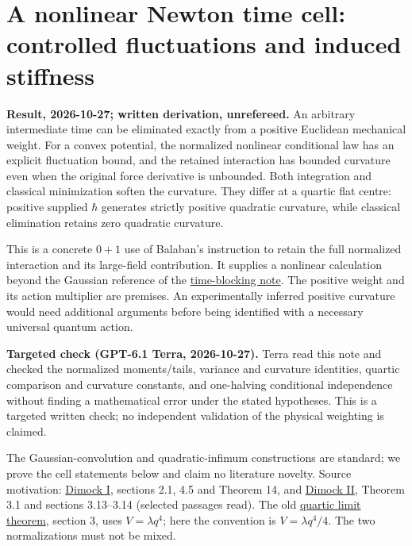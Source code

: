 \documentclass[11pt,a4paper]{article}
\begin{document}
\hypertarget{a-nonlinear-newton-time-cell-controlled-fluctuations-and-induced-stiffness}{%
\section{A nonlinear Newton time cell: controlled fluctuations and
induced
stiffness}\label{a-nonlinear-newton-time-cell-controlled-fluctuations-and-induced-stiffness}}

\textbf{Result, 2026-10-27; written derivation, unrefereed.} An
arbitrary intermediate time can be eliminated exactly from a positive
Euclidean mechanical weight. For a convex potential, the normalized
nonlinear conditional law has an explicit fluctuation bound, and the
retained interaction has bounded curvature even when the original force
derivative is unbounded. Both integration and classical minimization
soften the curvature. They differ at a quartic flat centre: positive
supplied \(\hbar\) generates strictly positive quadratic curvature,
while classical elimination retains zero quadratic curvature.

This is a concrete \(0+1\) use of Balaban's instruction to retain the
full normalized interaction and its large-field contribution. It
supplies a nonlinear calculation beyond the Gaussian reference of the
\href{balaban-newton-time-blocking.md}{time-blocking note}. The positive
weight and its action multiplier are premises. An experimentally
inferred positive curvature would need additional arguments before being
identified with a necessary universal quantum action.

\textbf{Targeted check (GPT-6.1 Terra, 2026-10-27).} Terra read this
note and checked the normalized moments/tails, variance and curvature
identities, quartic comparison and curvature constants, and one-halving
conditional independence without finding a mathematical error under the
stated hypotheses. This is a targeted written check; no independent
validation of the physical weighting is claimed.

The Gaussian-convolution and quadratic-infimum constructions are
standard; we prove the cell statements below and claim no literature
novelty. Source motivation:
\href{../docs/balaban/Dimock_BalabanI_1108.1335v2.md}{Dimock I},
sections 2.1, 4.5 and Theorem 14, and
\href{../docs/balaban/Dimock_BalabanII_1212.5562v2.md}{Dimock II},
Theorem 3.1 and sections 3.13--3.14 (selected passages read). The old
\href{rivero-1998-conjecture-central-forces.md}{quartic limit theorem},
section 3, uses \(V=\lambda q^4\); here the convention is
\(V=\lambda q^4/4\). The two normalizations must not be mixed.
\end{document}
